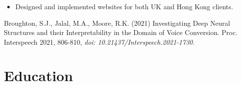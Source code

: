 \documentclass[10pt]{article} %
\begin{document}
\begin{changemargin}{0pt}{0.5pt}
\begin{minipage}[t]{0.5\textwidth}
\begin{changemargin}{1pt}{1pt}
\begin{itemize} \itemsep-2pt %
  \item Designed and implemented websites for both UK and Hong Kong clients.  
\end{itemize}


\end{changemargin}
\end{minipage} %
\hfill
\begin{minipage}[t]{0.44\textwidth} %
\vspace{0pt} %


\begin{thebibliography}{1}
	
	 Broughton, S.J., Jalal, M.A., Moore, R.K. (2021) Investigating Deep Neural Structures and their Interpretability in the Domain of Voice Conversion. Proc. Interspeech 2021, 806-810, \textit{doi: 10.21437/Interspeech.2021-1730}.
	
\end{thebibliography}


\section{Education}

\begin{changemargin}{1pt}{1pt}







\end{changemargin}
\end{minipage}
\end{changemargin}
\end{document}
